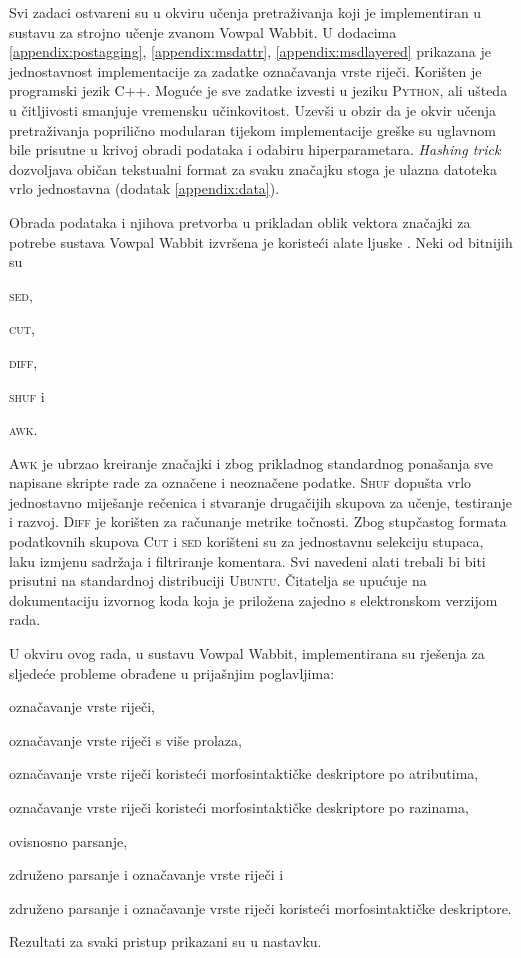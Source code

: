Svi zadaci ostvareni su u okviru učenja pretraživanja koji je implementiran u
sustavu za strojno učenje zvanom Vowpal Wabbit. U dodacima
\ref{appendix:postagging}, \ref{appendix:msdattr}, \ref{appendix:msdlayered}
prikazana je jednostavnost implementacije za zadatke označavanja vrste riječi.
Korišten je programski jezik \textsc{C++}. Moguće je sve zadatke izvesti u
jeziku \textsc{Python}, ali ušteda u čitljivosti smanjuje vremensku
učinkovitost. Uzevši u obzir da je okvir učenja pretraživanja poprilično
modularan tijekom implementacije greške su uglavnom bile prisutne u krivoj
obradi podataka i odabiru hiperparametara. \textit{Hashing trick} dozvoljava
običan tekstualni format za svaku značajku stoga je ulazna datoteka vrlo
jednostavna (dodatak \ref{appendix:data}).

Obrada podataka i njihova pretvorba u prikladan oblik vektora značajki za
potrebe sustava Vowpal Wabbit izvršena je koristeći alate ljuske .
Neki od  bitnijih su
\begin{inlinelist}
  \item \textsc{sed},
  \item \textsc{cut},
  \item \textsc{diff},
  \item \textsc{shuf} i
  \item \textsc{awk}.
\end{inlinelist}
\textsc{Awk} je ubrzao kreiranje značajki i zbog prikladnog standardnog
ponašanja sve napisane skripte rade za označene i neoznačene podatke.
\textsc{Shuf} dopušta vrlo jednostavno miješanje rečenica i stvaranje drugačijih
skupova za učenje, testiranje i razvoj. \textsc{Diff} je korišten za računanje
metrike točnosti. Zbog stupčastog formata podatkovnih skupova \textsc{Cut} i
\textsc{sed} korišteni su za jednostavnu selekciju stupaca, laku izmjenu
sadržaja i filtriranje komentara. Svi navedeni alati trebali bi biti prisutni na
standardnoj distribuciji \textsc{Ubuntu}. Čitatelja se upućuje na dokumentaciju
izvornog koda koja je priložena zajedno s elektronskom verzijom rada.

U okviru ovog rada, u sustavu Vowpal Wabbit, implementirana su rješenja za
sljedeće probleme obrađene u prijašnjim poglavljima:
\begin{inlinelist}
  \item označavanje vrste riječi,
  \item označavanje vrste riječi s više prolaza,
  \item označavanje vrste riječi koristeći morfosintaktičke deskriptore po atributima,
  \item označavanje vrste riječi koristeći morfosintaktičke deskriptore po razinama,
  \item ovisnosno parsanje,
  \item združeno parsanje i označavanje vrste riječi i
  \item združeno parsanje i označavanje vrste riječi koristeći morfosintaktičke deskriptore.
\end{inlinelist}
Rezultati za svaki pristup prikazani su u nastavku.

